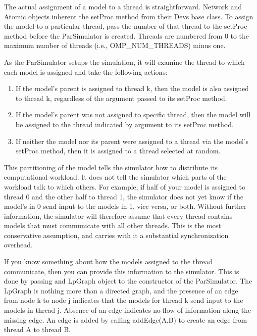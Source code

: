 The actual assignment of a model to a thread is straightforward. Network and Atomic objects inherent the setProc method from their Devs base class. To assign the model to a particular thread, pass the number of that thread to the setProc method before the ParSimulator is created. Threads are numbered from 0 to the maximum number of threads (i.e., OMP\_NUM\_THREADS) minus one.

As the ParSimulator setups the simulation, it will examine the thread to which each model is assigned and take the following actions:
\begin{enumerate}
\item If the model's parent is assigned to thread k, then the model is also assigned to thread k, regardless of the argument passed to its setProc method.
\item If the model's parent was not assigned to specific thread, then the model will be assigned to the thread indicated by argument to its setProc method.
\item If neither the model nor its parent were assigned to a thread via the model's setProc method, then it is assigned to a thread selected at random.
\end{enumerate}

This partitioning of the model tells the simulator how to distribute its computational workload. It does not tell the simulator which parts of the workload talk to which others. For example, if half of your model is assigned to thread 0 and the other half to thread 1, the simulator does not yet know if the model's in 0 send input to the models in 1, vice versa, or both. Without further information, the simulator will therefore assume that every thread contains models that must communicate with all other threads. This is the most conservative assumption, and carries with it a substantial synchronization overhead.

If you know something about how the models assigned to the thread communicate, then you can provide this information to the simulator. This is done by passing and LpGraph object to the constructor of the ParSimulator. The LpGraph is nothing more than a directed graph, and the presence of an edge from node k to node j indicates that the models for thread k send input to the models in thread j. Absence of an edge indicates no flow of information along the missing edge. An edge is added by calling addEdge(A,B) to create an edge from thread A to thread B.


